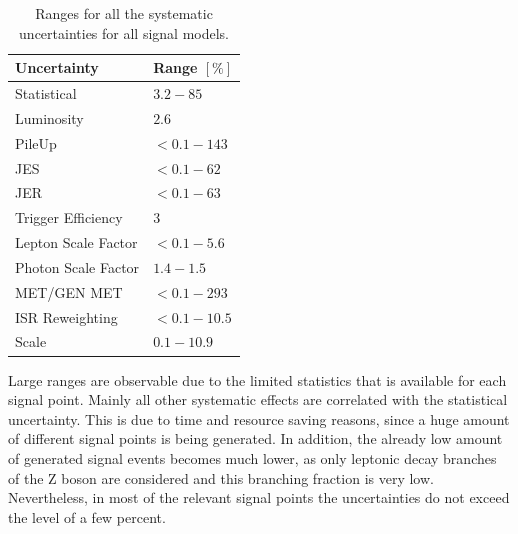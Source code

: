 \begin{table}[tbp]
 \centering
 \caption{Ranges for all the systematic uncertainties for all signal models.}
 \normalsize
 \label{tab:systuncSignal}
 \begin{tabular}[width=\textwidth]{ll}
  Uncertainty         & Range $[\%]$ \\\hline
  Statistical         & $3.2-85$     \\
  Luminosity          & $2.6$        \\
  PileUp              & $<0.1-143$   \\
  JES                 & $<0.1-62$    \\
  JER                 & $<0.1-63$    \\
  Trigger Efficiency  & $3$          \\
  Lepton Scale Factor & $<0.1-5.6$   \\
  Photon Scale Factor & $1.4-1.5$    \\
  MET/GEN MET         & $<0.1-293$   \\
  ISR Reweighting     & $<0.1-10.5$  \\
  Scale               & $0.1-10.9$   \\
  \hline
 \end{tabular}
\end{table}
Large ranges are observable due to the limited statistics that is available for each signal point. Mainly all other systematic effects are correlated with the statistical uncertainty. This is due to time and resource saving reasons, since a huge amount of different signal points is being generated. In addition, the already low amount of generated signal events becomes much lower, as only leptonic decay branches of the Z boson are considered and this branching fraction is very low. Nevertheless, in most of the relevant signal points the uncertainties do not exceed the level of a few percent.
